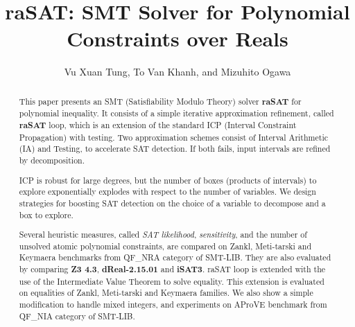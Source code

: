 \documentclass[runningheads,a4paper,oribibl]{llncs}
\begin{document}
%
\title{{\bf raSAT}: SMT Solver for Polynomial Constraints over Reals}

\author{Vu Xuan Tung, To Van Khanh, and Mizuhito Ogawa} 


\maketitle

\begin{abstract}
This paper presents an SMT (Satisfiability Modulo Theory) solver {\bf raSAT} for polynomial inequality. 
It consists of a simple iterative approximation refinement, called {\bf raSAT} loop, 
which is an extension of the standard ICP (Interval Constraint Propagation) with testing. 
Two approximation schemes consist of Interval Arithmetic (IA) and 
Testing, to accelerate SAT detection. 
If both fails, input intervals are refined by decomposition. 

ICP is robust for large degrees, but the number of boxes (products of intervals) to explore 
exponentially explodes with respect to the number of variables. 
We design strategies for boosting SAT detection on the choice of a variable to decompose
and a box to explore. 

Several heuristic measures, called {\em SAT likelihood}, {\em sensitivity}, and the number of 
unsolved atomic polynomial constraints, are compared on Zankl, Meti-tarski and Keymaera benchmarks from 
QF\_NRA category of SMT-LIB. They are also evaluated by comparing {\bf Z3 4.3}, \textbf{dReal-2.15.01} and {\bf iSAT3}. 
raSAT loop is extended with the use of the Intermediate Value Theorem to solve equality. This extension is evaluated on equalities of Zankl, Meti-tarski and Keymaera families.
We also show a simple modification to handle mixed integers, and experiments on 
AProVE benchmark from QF\_NIA category of SMT-LIB. 
\end{abstract}
\end{document}
